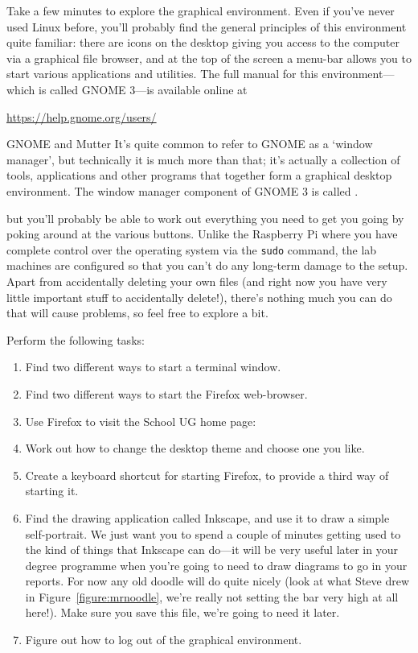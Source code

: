 Take a few minutes to explore the graphical environment. Even if you've never used Linux before, you'll probably find the general principles of this environment quite familiar: there are icons on the desktop giving you access to the computer via a graphical file browser, and at the top of the screen a menu-bar allows you to start various applications and utilities. The full manual for this environment---which is called GNOME 3---is available online at

\noindent\url{https://help.gnome.org/users/}

\begin{linux}{GNOME and Mutter}
It's quite common to refer to GNOME as a `window manager', but technically it is much more than that; it's actually a collection of tools, applications and other programs that together form a graphical desktop environment. The window manager component of GNOME 3 is called .
\end{linux}

\noindent but you'll probably be able to work out everything you need to get you going by poking around at the various buttons. Unlike the Raspberry Pi where you have complete control over the operating system via the \texttt{sudo} command, the lab machines are configured so that you can't do any long-term damage to the setup. Apart from accidentally deleting your own files (and right now you have very little important stuff to accidentally delete!), there's nothing much you can do that will cause problems, so feel free to explore a bit.

Perform the following tasks:
\begin{enumerate}
\item Find two different ways to start a terminal window.
\item Find two different ways to start the Firefox web-browser.
\item Use Firefox to visit the School UG home page:
\item Work out how to change the desktop theme and choose one you like.
\item Create a keyboard shortcut for starting Firefox, to provide a third way of starting it.
\item Find the  drawing application called Inkscape, and use it to draw a simple self-portrait. We just want you to spend a couple of minutes getting used to the kind of things that Inkscape can do---it will be very useful later in your degree programme when you're going to need to draw diagrams to go in your reports. For now any old doodle will do quite nicely (look at what Steve drew in Figure~\ref{figure:mrnoodle}, we're really not setting the bar very high at all here!). Make sure you save this file, we're going to need it later.
\item Figure out how to log out of the graphical environment. \label{list:logout}
\end{enumerate}

